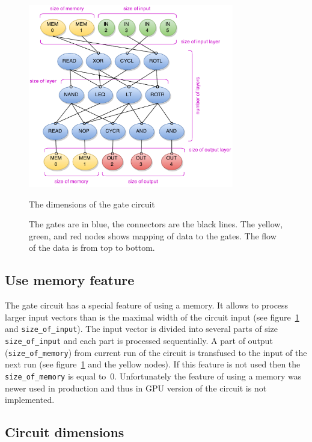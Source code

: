 \documentclass[12pt,oneside]{fithesis2}
\begin{document}
\begin{figure}[h]
	\centering
	\includegraphics[width=0.8\textwidth]{figures/gate_circuit.pdf}
	\caption{The dimensions of the gate circuit}
	\caption*{The gates are in blue, the connectors are the black lines. The yellow, green, and red nodes shows mapping of data to the gates. The flow of the data is from top to bottom.}
	\label{fig:gate_circuit}
\end{figure}

\subsection{Use memory feature}

The gate circuit has a special feature of using a memory. It allows to process larger input vectors than is the maximal width of the circuit input (see figure~\ref{fig:gate_circuit} and \texttt{size\_of\_input}). The input vector is divided into several parts of size \texttt{size\_of\_input} and each part is processed sequentially. A part of output (\texttt{size\_of\_memory}) from current run of the circuit is transfused to the input of the next run (see figure~\ref{fig:gate_circuit} and the yellow nodes). If this feature is not used then the \texttt{size\_of\_memory} is equal to~$0$. Unfortunately the feature of using a memory was newer used in production and thus in GPU version of the circuit is not implemented.

\subsection{Circuit dimensions}
\end{document}

